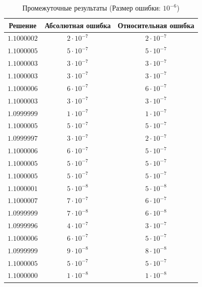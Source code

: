 \begin{table}[h]
   \centering
   \caption{Промежуточные результаты (Размер ошибки: $10^{-6}$)}
   \begin{tabular}{|c|c|c|}
       \hline
       Решение & Абсолютная ошибка & Относительная ошибка \\
       \hline
       $1.1000002$ & $2 \cdot 10^{-7}$ & $2 \cdot 10^{-7}$ \\
       \hline
       $1.1000005$ & $5 \cdot 10^{-7}$ & $5 \cdot 10^{-7}$ \\
       \hline
       $1.1000003$ & $3 \cdot 10^{-7}$ & $3 \cdot 10^{-7}$ \\
       \hline
       $1.1000003$ & $3 \cdot 10^{-7}$ & $3 \cdot 10^{-7}$ \\
       \hline
       $1.1000006$ & $6 \cdot 10^{-7}$ & $6 \cdot 10^{-7}$ \\
       \hline
       $1.1000003$ & $3 \cdot 10^{-7}$ & $3 \cdot 10^{-7}$ \\
       \hline
       $1.0999999$ & $1 \cdot 10^{-7}$ & $1 \cdot 10^{-7}$ \\
       \hline
       $1.1000005$ & $5 \cdot 10^{-7}$ & $5 \cdot 10^{-7}$ \\
       \hline
       $1.0999997$ & $3 \cdot 10^{-7}$ & $2 \cdot 10^{-7}$ \\
       \hline
       $1.1000006$ & $6 \cdot 10^{-7}$ & $5 \cdot 10^{-7}$ \\
       \hline
       $1.1000005$ & $5 \cdot 10^{-7}$ & $5 \cdot 10^{-7}$ \\
       \hline
       $1.1000005$ & $5 \cdot 10^{-7}$ & $5 \cdot 10^{-7}$ \\
       \hline
       $1.1000001$ & $5 \cdot 10^{-8}$ & $5 \cdot 10^{-8}$ \\
       \hline
       $1.1000007$ & $7 \cdot 10^{-7}$ & $6 \cdot 10^{-7}$ \\
       \hline
       $1.0999999$ & $7 \cdot 10^{-8}$ & $6 \cdot 10^{-8}$ \\
       \hline
       $1.0999996$ & $4 \cdot 10^{-7}$ & $3 \cdot 10^{-7}$ \\
       \hline
       $1.1000006$ & $6 \cdot 10^{-7}$ & $5 \cdot 10^{-7}$ \\
       \hline
       $1.0999999$ & $9 \cdot 10^{-8}$ & $8 \cdot 10^{-8}$ \\
       \hline
       $1.1000005$ & $5 \cdot 10^{-7}$ & $5 \cdot 10^{-7}$ \\
       \hline
       $1.1000000$ & $1 \cdot 10^{-8}$ & $1 \cdot 10^{-8}$ \\

\end{tabular}
\end{table}
